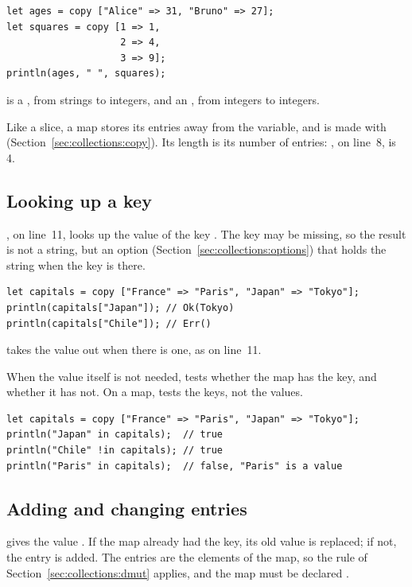 \begin{lstlisting}[style=coloredverbatim]
let ages = copy ["Alice" => 31, "Bruno" => 27];
let squares = copy [1 => 1,
                    2 => 4,
                    3 => 9];
println(ages, " ", squares);
\end{lstlisting}

 is a \token{[[c8] => i32]}, from strings to integers, and
 an \token{[i32 => i32]}, from integers to integers.

Like a slice, a map stores its entries away from the variable, and is made with
 (Section~\ref{sec:collections:copy}). Its length is its number of
entries: , on line~8, is 4.

\subsection{Looking up a key}

, on line~11, looks up the value of the key
. The key may be missing, so the result is not a string, but an
option (Section~\ref{sec:collections:options}) that holds the string when the key
is there.

\begin{lstlisting}[style=coloredverbatim]
let capitals = copy ["France" => "Paris", "Japan" => "Tokyo"];
println(capitals["Japan"]); // Ok(Tokyo)
println(capitals["Chile"]); // Err()
\end{lstlisting}

 takes the value out when there is one, as on line~11.

When the value itself is not needed,  tests whether the map
 has the key, and  whether it has not. On a map,
 tests the keys, not the values.

\begin{lstlisting}[style=coloredverbatim]
let capitals = copy ["France" => "Paris", "Japan" => "Tokyo"];
println("Japan" in capitals);  // true
println("Chile" !in capitals); // true
println("Paris" in capitals);  // false, "Paris" is a value
\end{lstlisting}

\subsection{Adding and changing entries}

 gives  the value . If the map
already had the key, its old value is replaced; if not, the entry is added. The
entries are the elements of the map, so the rule of
Section~\ref{sec:collections:dmut} applies, and the map must be declared
.

